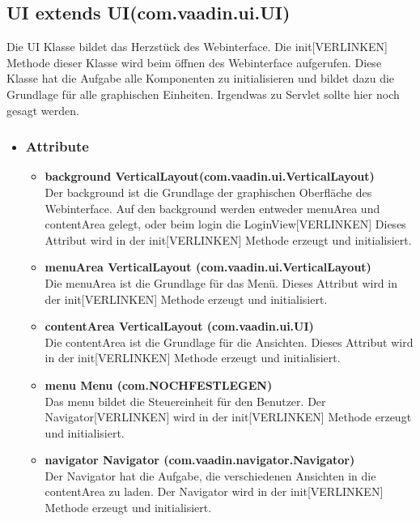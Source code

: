 \newpage
\subsection{UI extends UI(com.vaadin.ui.UI)}
Die UI Klasse bildet das Herzstück des Webinterface. Die init[VERLINKEN] Methode dieser Klasse wird beim öffnen des Webinterface aufgerufen. Diese Klasse hat die Aufgabe alle Komponenten zu initialisieren und bildet dazu die Grundlage für alle graphischen Einheiten. Irgendwas zu Servlet sollte hier noch gesagt werden.
\begin{itemize}
\item \subsubsection{Attribute}
\begin{itemize}
\item \textbf{background VerticalLayout(com.vaadin.ui.VerticalLayout)} \hfill\\ 
Der background ist die Grundlage der graphischen Oberfläche des Webinterface. Auf den background werden entweder menuArea und contentArea gelegt, oder beim login die LoginView[VERLINKEN] Dieses Attribut wird in der init[VERLINKEN] Methode erzeugt und initialisiert.

\item \textbf{menuArea VerticalLayout (com.vaadin.ui.VerticalLayout)} \hfill\\ 
Die menuArea ist die Grundlage für das Menü. Dieses Attribut wird in der init[VERLINKEN] Methode erzeugt und initialisiert.

\item \textbf{contentArea VerticalLayout (com.vaadin.ui.UI)} \hfill\\ 
Die contentArea ist die Grundlage für die Ansichten. Dieses Attribut wird in der init[VERLINKEN] Methode erzeugt und initialisiert.

\item \textbf{menu Menu (com.NOCHFESTLEGEN)} \hfill\\ 
Das menu bildet die Steuereinheit für den Benutzer. Der Navigator[VERLINKEN] wird in der init[VERLINKEN] Methode erzeugt und initialisiert.

\item \textbf{navigator Navigator (com.vaadin.navigator.Navigator)} \hfill\\ 
Der Navigator hat die Aufgabe, die verschiedenen Ansichten in die contentArea zu laden. Der Navigator wird in der init[VERLINKEN] Methode erzeugt und initialisiert.


\end{itemize}
\end{itemize}
